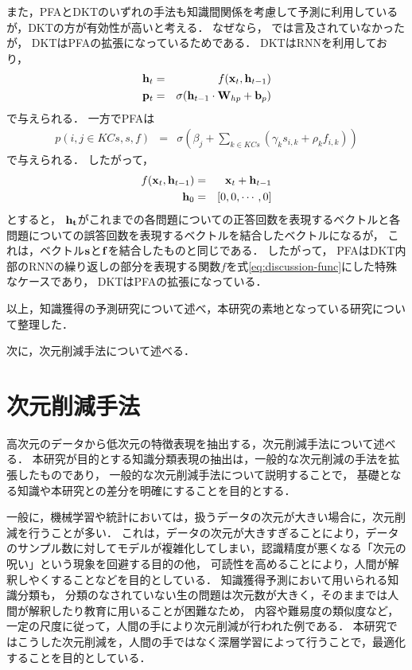 また，PFAとDKTのいずれの手法も知識間関係を考慮して予測に利用しているが，DKTの方が有効性が高いと考える．
なぜなら，
\cite{piech2015deep}では言及されていなかったが，
DKTはPFAの拡張になっているためである．
DKTはRNNを利用しており，
\begin{eqnarray}
{\bf h}_t & = & f({\bf x}_t, {\bf h}_{t-1})\\
{\bf p}_t & = & \sigma({\bf h}_{t-1} \cdot {\bf W}_{hp} + {\bf b}_p)
\end{eqnarray}
で与えられる．
一方でPFAは
\begin{eqnarray}
	p(i, j \in KCs, s, f) & = & \sigma( \beta _j + \sum_{k \in KCs}(\gamma_k s_{i, k} + \rho _k f_{i, k}) )
\end{eqnarray}
で与えられる．
したがって，
\begin{eqnarray}
\label{eq:discussion-func}
	f({\bf x}_t, {\bf h}_{t-1}) &=& {\bf x}_t + {\bf h}_{t-1}\\
	{\bf h}_{0} & = & [0, 0, \cdots , 0]
\end{eqnarray}
とすると，
${\bf h_t}$がこれまでの各問題についての正答回数を表現するベクトルと各問題についての誤答回数を表現するベクトルを結合したベクトルになるが， 
これは，ベクトル${\bf s}$と${\bf f}$を結合したものと同じである．
したがって，
PFAはDKT内部のRNNの繰り返しの部分を表現する関数$f$を式\ref{eq:discussion-func}にした特殊なケースであり，
DKTはPFAの拡張になっている．

\vvspace
以上，知識獲得の予測研究について述べ，本研究の素地となっている研究について整理した．

次に，次元削減手法について述べる．


\section{次元削減手法}
高次元のデータから低次元の特徴表現を抽出する，次元削減手法について述べる．
本研究が目的とする知識分類表現の抽出は，一般的な次元削減の手法を拡張したものであり，
一般的な次元削減手法について説明することで，
基礎となる知識や本研究との差分を明確にすることを目的とする．


一般に，機械学習や統計においては，扱うデータの次元が大きい場合に，次元削減を行うことが多い．
これは，データの次元が大きすぎることにより，データのサンプル数に対してモデルが複雑化してしまい，認識精度が悪くなる「次元の呪い」\cite{bellman1957dynamic,friedman1997bias}という現象を回避する目的の他，
可読性を高めることにより，人間が解釈しやくすることなどを目的としている．
知識獲得予測において用いられる知識分類も，
分類のなされていない生の問題は次元数が大きく，そのままでは人間が解釈したり教育に用いることが困難なため，
内容や難易度の類似度など，一定の尺度に従って，人間の手により次元削減が行われた例である．
本研究ではこうした次元削減を，人間の手ではなく深層学習によって行うことで，最適化することを目的としている．


